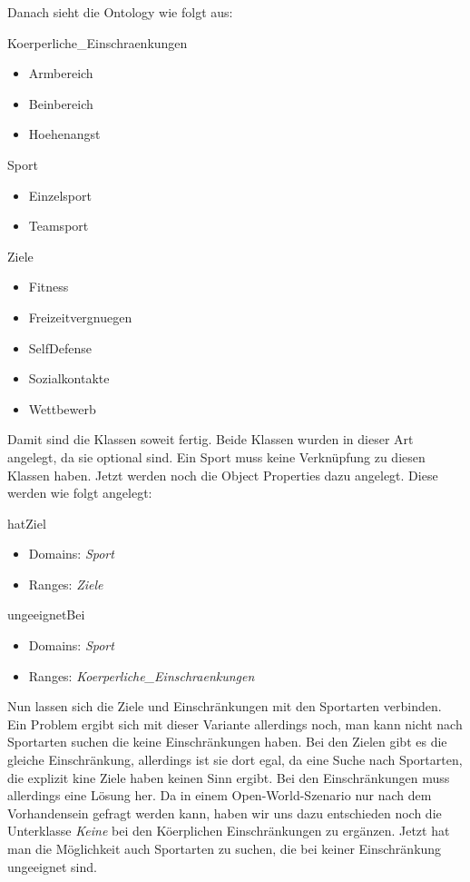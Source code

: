 Danach sieht die Ontology wie folgt aus:
\begin{capitemize}
	\item Koerperliche\_Einschraenkungen
		\begin{itemize}
				\item Armbereich
				\item Beinbereich
				\item Hoehenangst
		\end{itemize}
	\item Sport
		\begin{itemize}
			\item Einzelsport
			\item Teamsport
		\end{itemize}
	\item Ziele
		\begin{itemize}
				\item Fitness
				\item Freizeitvergnuegen
				\item SelfDefense
				\item Sozialkontakte
				\item Wettbewerb
		\end{itemize}
\end{capitemize}

Damit sind die Klassen soweit fertig. Beide Klassen wurden in dieser Art angelegt, da sie optional sind. Ein Sport muss keine Verkn\"upfung zu diesen Klassen haben. Jetzt werden noch die Object Properties dazu angelegt. Diese werden wie folgt angelegt:

\begin{capitemize}
	\item hatZiel
		\begin{itemize}
			\item Domains: \textit{Sport}
			\item Ranges: \textit{Ziele}
		\end{itemize}
	\item ungeeignetBei
		\begin{itemize}
			\item Domains: \textit{Sport}
			\item Ranges: \textit{Koerperliche\_Einschraenkungen}
		\end{itemize}
\end{capitemize}

Nun lassen sich die Ziele und Einschr\"ankungen mit den Sportarten verbinden. Ein Problem ergibt sich mit dieser Variante allerdings noch, man kann nicht nach Sportarten suchen die keine Einschr\"ankungen haben. Bei den Zielen gibt es die gleiche Einschr\"ankung, allerdings ist sie dort egal, da eine Suche nach Sportarten, die explizit kine Ziele haben keinen Sinn ergibt. Bei den Einschr\"ankungen muss allerdings eine L\"osung her. Da in einem Open-World-Szenario nur nach dem Vorhandensein gefragt werden kann, haben wir uns dazu entschieden noch die Unterklasse \textit{Keine} bei den K\"oerplichen Einschr\"ankungen zu erg\"anzen. Jetzt hat man die M\"oglichkeit auch Sportarten zu suchen, die bei keiner Einschr\"ankung ungeeignet sind.

